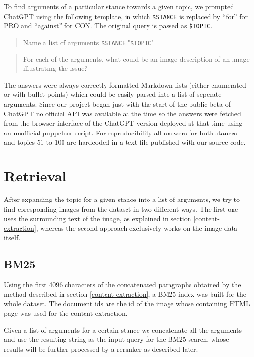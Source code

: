 \documentclass[
]{ceurart}
\begin{document}
To find arguments of a particular stance towards a given topic, we prompted ChatGPT using the following template, in which \texttt{\$STANCE} is replaced by \enquote{for} for PRO and \enquote{against} for CON. The original query is passed as \texttt{\$TOPIC}.

\begin{quote}
	Name a list of arguments \texttt{\$STANCE} "\texttt{\$TOPIC}"
\end{quote}
\begin{quote}
    For each of the arguments, what could be an image description of an image illustrating the issue?
\end{quote}

The answers were always correctly formatted Markdown lists (either enumerated or with bullet points) which could be easily parsed into a list of seperate arguments. Since our project began just with the start of the public beta of ChatGPT no official API was available at the time so the answers were fetched from the browser interface of the ChatGPT version deployed at that time using an unofficial puppeteer script. For reproducibility all answers for both stances and topics 51 to 100 are hardcoded in a text file published with our source code.

\section{Retrieval}

After expanding the topic for a given stance into a list of arguments, we try to find coresponding images from the dataset in two different ways. The first one uses the surrounding text of the image, as explained in section \ref{content-extraction}, whereas the second approach exclusively works on the image data itself.

\subsection{BM25}

Using the first 4096 characters of the concatenated paragraphs obtained by the method described in section \ref{content-extraction}, a BM25 index was built for the whole dataset. The document ids are the id of the image whose containing HTML page was used for the content extraction.

Given a list of arguments for a certain stance we concatenate all the arguments and use the resulting string as the input query for the BM25 search, whose results will be further processed by a reranker as described later.
\end{document}
